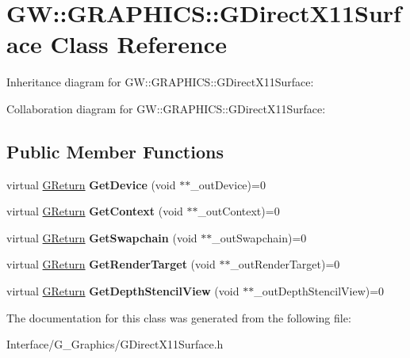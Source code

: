 \hypertarget{classGW_1_1GRAPHICS_1_1GDirectX11Surface}{}\section{GW\+:\+:G\+R\+A\+P\+H\+I\+CS\+:\+:G\+Direct\+X11\+Surface Class Reference}
\label{classGW_1_1GRAPHICS_1_1GDirectX11Surface}


Inheritance diagram for GW\+:\+:G\+R\+A\+P\+H\+I\+CS\+:\+:G\+Direct\+X11\+Surface\+:


Collaboration diagram for GW\+:\+:G\+R\+A\+P\+H\+I\+CS\+:\+:G\+Direct\+X11\+Surface\+:
\subsection*{Public Member Functions}
\begin{DoxyCompactItemize}
\item 
\mbox{\label{classGW_1_1GRAPHICS_1_1GDirectX11Surface_a076c4f3a07f79f578185416be449ebd2}} 
virtual \hyperlink{namespaceGW_a67a839e3df7ea8a5c5686613a7a3de21}{G\+Return} {\bfseries Get\+Device} (void $\ast$$\ast$\+\_\+out\+Device)=0
\item 
\mbox{\label{classGW_1_1GRAPHICS_1_1GDirectX11Surface_aceaa2e22cbdee6c651cf2045d9320041}} 
virtual \hyperlink{namespaceGW_a67a839e3df7ea8a5c5686613a7a3de21}{G\+Return} {\bfseries Get\+Context} (void $\ast$$\ast$\+\_\+out\+Context)=0
\item 
\mbox{\label{classGW_1_1GRAPHICS_1_1GDirectX11Surface_a8388438c79a82a10f595e10b0bbaab2c}} 
virtual \hyperlink{namespaceGW_a67a839e3df7ea8a5c5686613a7a3de21}{G\+Return} {\bfseries Get\+Swapchain} (void $\ast$$\ast$\+\_\+out\+Swapchain)=0
\item 
\mbox{\label{classGW_1_1GRAPHICS_1_1GDirectX11Surface_a953f4809860408b0e99928ac8b9b6a53}} 
virtual \hyperlink{namespaceGW_a67a839e3df7ea8a5c5686613a7a3de21}{G\+Return} {\bfseries Get\+Render\+Target} (void $\ast$$\ast$\+\_\+out\+Render\+Target)=0
\item 
\mbox{\label{classGW_1_1GRAPHICS_1_1GDirectX11Surface_a44937f7b6e85b0b8df3ac6871c4b87a3}} 
virtual \hyperlink{namespaceGW_a67a839e3df7ea8a5c5686613a7a3de21}{G\+Return} {\bfseries Get\+Depth\+Stencil\+View} (void $\ast$$\ast$\+\_\+out\+Depth\+Stencil\+View)=0
\end{DoxyCompactItemize}


The documentation for this class was generated from the following file\+:\begin{DoxyCompactItemize}
\item 
Interface/\+G\+\_\+\+Graphics/G\+Direct\+X11\+Surface.\+h\end{DoxyCompactItemize}
